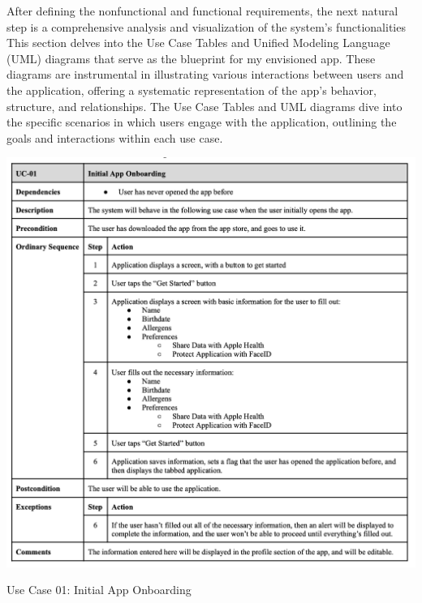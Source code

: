 After defining the nonfunctional and functional requirements, the next natural step is a comprehensive analysis and visualization of the system's functionalities This section delves into the Use Case Tables and Unified Modeling Language (UML) diagrams that serve as the blueprint for my envisioned app. These diagrams are instrumental in illustrating various interactions between users and the application, offering a systematic representation of the app's behavior, structure, and relationships. The Use Case Tables and UML diagrams dive into the specific scenarios in which users engage with the application, outlining the goals and interactions within each use case.

% 
% 

\begin{table} [H]
    \centering
    \includegraphics[width=1\linewidth]{thesis//chapters//images/uc-01.png}
    \caption{Use Case 01: Initial App Onboarding}
    \label{fig:uc01-table}
\end{table}


